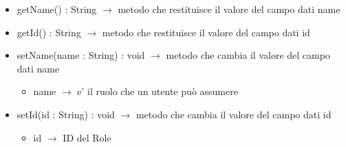 \begin{description}
\begin{itemize}
	\item getName() : String $\rightarrow$ metodo che restituisce il valore del campo dati name
	\item getId() : String $\rightarrow$ metodo che restituisce il valore del campo dati id
	\item setName(name : String) : void $\rightarrow$ metodo che cambia il valore del campo dati name\begin{itemize}
		\item name $\rightarrow$ e' il ruolo che un utente può assumere
	\end{itemize}
	
	\item setId(id : String) : void $\rightarrow$ metodo che cambia il valore del campo dati id\begin{itemize}
		\item id $\rightarrow$ ID del Role
	\end{itemize}
	
\end{itemize}

\end{description}

